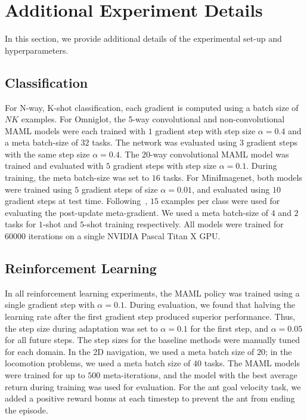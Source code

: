 \documentclass{article}
\begin{document}



\clearpage

\appendix


\section{Additional Experiment Details}
\label{app:hyper}

In this section, we provide additional details of the experimental set-up and hyperparameters.

\subsection{Classification}
\label{app:hyperclass}

For N-way, K-shot classification, each gradient is computed using a batch size of $NK$ examples.
For Omniglot, the 5-way convolutional and non-convolutional MAML models were each trained with $1$ gradient step with step size $\alpha=0.4$ and a meta batch-size of $32$ tasks. The network was evaluated using $3$ gradient steps with the same step size $\alpha=0.4$. The 20-way convolutional MAML model was trained and evaluated with $5$ gradient steps with step size $\alpha=0.1$. During training, the meta batch-size was set to $16$ tasks. For MiniImagenet, both models were trained using $5$ gradient steps of size $\alpha=0.01$, and evaluated using $10$ gradient steps at test time. Following~\citet{hugo}, $15$ examples per class were used for evaluating the post-update meta-gradient. We used a meta batch-size of $4$ and $2$ tasks for $1$-shot and $5$-shot training respectively.
All models were trained for $60000$ iterations on a single NVIDIA Pascal Titan X GPU. 

\subsection{Reinforcement Learning}
\label{app:hyperrl}

In all reinforcement learning experiments, the MAML policy was trained using a single gradient step with $\alpha=0.1$. During evaluation, we found that halving the learning rate after the first gradient step produced superior performance. Thus, the step size during adaptation was set to $\alpha=0.1$ for the first step, and $\alpha=0.05$ for all future steps. The step sizes for the baseline methods were manually tuned for each domain. In the 2D navigation, we used a meta batch size of $20$; in the locomotion problems, we used a meta batch size of $40$ tasks. The MAML models were trained for up to $500$ meta-iterations, and the model with the best average return during training was used for evaluation. For the ant goal velocity task, we added a positive reward bonus at each timestep to prevent the ant from ending the episode.
\end{document}

